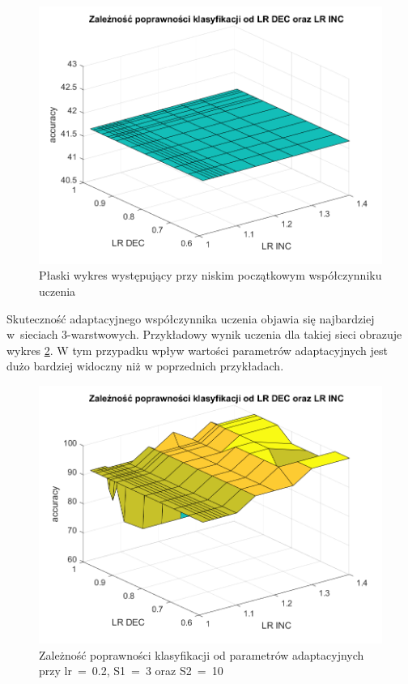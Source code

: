 \documentclass[12pt,twoside]{article}
\begin{document}
\begin{figure}[ht]
	\centering
	\includegraphics[width=16cm]{figures/IncDec_4.png}
	\caption{Płaski wykres występujący przy niskim początkowym współczynniku uczenia}
	\label{Fig:IncDec4}
\end{figure}

Skuteczność adaptacyjnego współczynnika uczenia objawia się najbardziej w~sieciach 3-warstwowych.
Przykładowy wynik uczenia dla takiej sieci obrazuje wykres \ref{Fig:IncDec5}.
W tym przypadku wpływ wartości parametrów adaptacyjnych jest dużo bardziej widoczny niż w poprzednich przykładach.

\begin{figure}[ht]
	\centering
	\includegraphics[width=16cm]{figures/IncDec_5.png}
	\caption{Zależność poprawności klasyfikacji od parametrów adaptacyjnych przy lr~=~0.2, S1~=~3 oraz S2~=~10}
	\label{Fig:IncDec5}
\end{figure}
\end{document}
